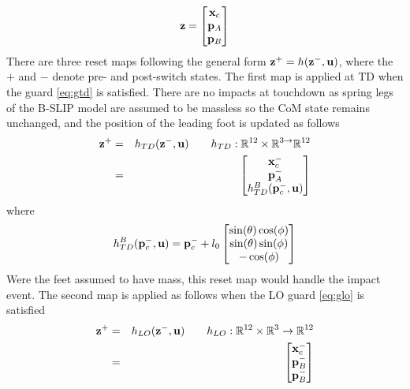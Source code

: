 \[
	\mathbf{z} = \begin{bmatrix}
			\mathbf{x}_{c} \\
			\mathbf{p}_{A} \\
			\mathbf{p}_{B}
	\end{bmatrix}
\]
There are three reset maps following the general form $ \mathbf{z}^+ = h(\mathbf{z}^-,\mathbf{u}) $, where the $ + $ and $ - $ denote pre- and post-switch states. The first map is applied at TD when the guard \eqref{eq:gtd} is satisfied. There are no impacts at touchdown as spring legs of the B-SLIP model are assumed to be massless so the CoM state remains unchanged, and the position of the leading foot is updated as follows 
\begin{eqnarray}
	\mathbf{z}^+ &=& h_{TD}(\mathbf{z}^-,\mathbf{u}) \qquad h_{TD}:\mathbb{R}^{12}\times \mathbb{R}^{3 \rightarrow } \mathbb{R}^{12} \\
	{}	&=& \begin{bmatrix}
		\mathbf{x}_{c}^- \\
		\mathbf{p}_{A}^- \\
		h_{TD}^{B}(\mathbf{p}_{c}^-, \mathbf{u})
	\end{bmatrix} \nonumber
\end{eqnarray}
where
\begin{equation}
	h_{TD}^{B}(\p_{c}^-, \u) = \p_{c}^- + l_0%
	\begin{bmatrix}
		\sin(\theta)\cos(\phi)\\
		\sin(\theta)\sin(\phi)\\
		-\cos(\phi)
	\end{bmatrix}
\end{equation}
Were the feet assumed to have mass, this reset map would handle the impact event. The second map is applied as follows when the LO guard \eqref{eq:glo} is satisfied
\begin{eqnarray}
	\mathbf{z}^+ &=& h_{LO}(\mathbf{z}^-,\mathbf{u}) \qquad h_{LO}:\mathbb{R}^{12} \times \mathbb{R}^{3} \rightarrow \mathbb{R}^{12} \\
	{}	&=& \begin{bmatrix}
		\mathbf{x}_{c}^- \\
		\mathbf{p}_{B}^- \\
		\mathbf{p}_{B}^-
	\end{bmatrix} \nonumber
\end{eqnarray}
